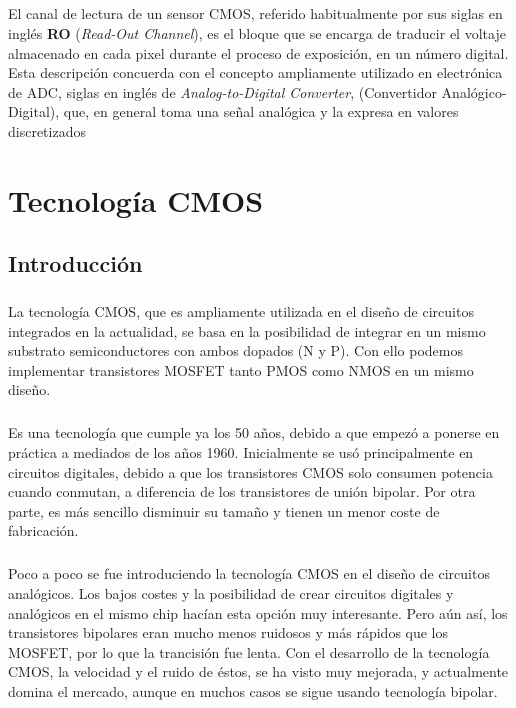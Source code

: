 \documentclass[12pt,a4paper,oneside,titlepage]{report}
\begin{document}
\paragraph{}
El canal de lectura de un sensor CMOS, referido habitualmente por sus
siglas en inglés \textbf{RO} (\textit{Read-Out Channel}), es el bloque que se
encarga de traducir el voltaje almacenado en cada pixel durante el proceso
de exposición, en un número digital. Esta descripción concuerda con el concepto
ampliamente utilizado en electrónica de ADC, siglas en inglés de \textit{Analog-to-Digital
Converter}, (Convertidor Analógico-Digital), que, en general toma una señal
analógica y la expresa en valores discretizados

\chapter{Tecnología CMOS}

\section{Introducción}

\paragraph{}
La tecnología CMOS, que es ampliamente utilizada en el diseño de circuitos integrados
en la actualidad, se basa en la posibilidad de integrar en un mismo substrato
semiconductores con ambos dopados (N y P). Con ello podemos implementar transistores
MOSFET tanto PMOS como NMOS en un mismo diseño.

\paragraph{}
Es una tecnología que cumple ya los
50 años, debido a que empezó a ponerse en práctica a mediados de los años 1960.
Inicialmente se usó principalmente en circuitos digitales, debido a que los
transistores CMOS solo consumen potencia cuando conmutan, a diferencia de los
transistores de unión bipolar. Por otra parte, es más sencillo disminuir su tamaño
y tienen un menor coste de fabricación.

\paragraph{}
Poco a poco se fue introduciendo la tecnología CMOS en el diseño de circuitos
analógicos. Los bajos costes y la posibilidad de crear circuitos digitales y
analógicos en el mismo chip hacían esta opción muy interesante. Pero aún así, los
transistores bipolares eran mucho menos ruidosos y más rápidos que los MOSFET, por
lo que la trancisión fue lenta. Con el desarrollo de la tecnología CMOS, la velocidad
y el ruido de éstos, se ha visto muy mejorada, y actualmente domina el mercado,
aunque en muchos casos se sigue usando tecnología bipolar.
\end{document}
